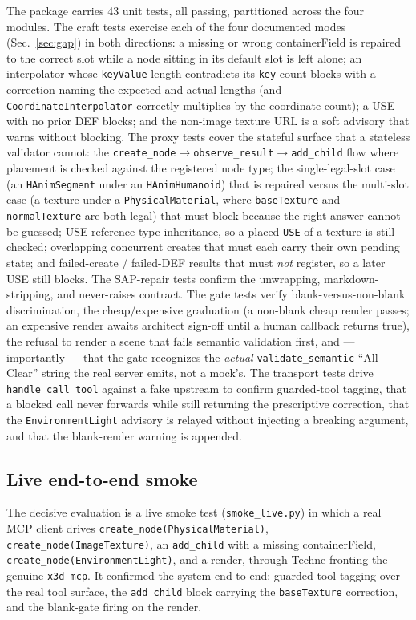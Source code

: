 \documentclass[sigconf,nonacm,screen,anonymous]{acmart}
\begin{document}
The package carries 43 unit tests, all passing, partitioned across the four modules. The craft tests exercise each of the four documented modes (Sec.~\ref{sec:gap}) in both directions: a missing or wrong containerField is repaired to the correct slot while a node sitting in its default slot is left alone; an interpolator whose \texttt{keyValue} length contradicts its \texttt{key} count blocks with a correction naming the expected and actual lengths (and \texttt{CoordinateInterpolator} correctly multiplies by the coordinate count); a USE with no prior DEF blocks; and the non-image texture URL is a soft advisory that warns without blocking. The proxy tests cover the stateful surface that a stateless validator cannot: the \texttt{create\_node}$\rightarrow$\texttt{observe\_result}$\rightarrow$\texttt{add\_child} flow where placement is checked against the registered node type; the single-legal-slot case (an \texttt{HAnimSegment} under an \texttt{HAnimHumanoid}) that is repaired versus the multi-slot case (a texture under a \texttt{PhysicalMaterial}, where \texttt{baseTexture} and \texttt{normalTexture} are both legal) that must block because the right answer cannot be guessed; USE-reference type inheritance, so a placed \texttt{USE} of a texture is still checked; overlapping concurrent creates that must each carry their own pending state; and failed-create / failed-DEF results that must \emph{not} register, so a later USE still blocks. The SAP-repair tests confirm the unwrapping, markdown-stripping, and never-raises contract. The gate tests verify blank-versus-non-blank discrimination, the cheap/expensive graduation (a non-blank cheap render passes; an expensive render awaits architect sign-off until a human callback returns true), the refusal to render a scene that fails semantic validation first, and --- importantly --- that the gate recognizes the \emph{actual} \texttt{validate\_semantic} ``All Clear'' string the real server emits, not a mock's. The transport tests drive \texttt{handle\_call\_tool} against a fake upstream to confirm guarded-tool tagging, that a blocked call never forwards while still returning the prescriptive correction, that the \texttt{EnvironmentLight} advisory is relayed without injecting a breaking argument, and that the blank-render warning is appended.

\subsection{Live end-to-end smoke}

The decisive evaluation is a live smoke test (\texttt{smoke\_live.py}) in which a real MCP client drives \texttt{create\_node(PhysicalMaterial)}, \texttt{create\_node(ImageTexture)}, an \texttt{add\_child} with a missing containerField, \texttt{create\_node(EnvironmentLight)}, and a render, through Techn\=e fronting the genuine \texttt{x3d\_mcp}. It confirmed the system end to end: guarded-tool tagging over the real tool surface, the \texttt{add\_child} block carrying the \texttt{baseTexture} correction, and the blank-gate firing on the render.
\end{document}
